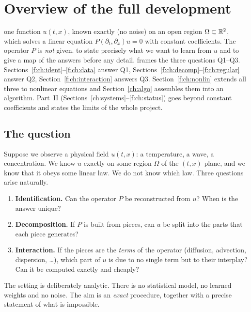 \section{Overview of the full development}\label{ch:intro}
\sectionbrief
{one function $u(t,x)$, known exactly (no noise) on an open region $\Omega\subset\mathbb{R}^2$, which solves a linear equation $P(\partial_t,\partial_x)u=0$ with constant coefficients. The operator $P$ is \emph{not} given.}
{to state precisely what we want to learn from $u$ and to give a map of the answers before any detail.}
{frames the three questions Q1--Q3. Sections~\ref{f:ch:ident}--\ref{f:ch:data} answer Q1, Sections~\ref{f:ch:decomp}--\ref{f:ch:regular} answer Q2, Section~\ref{f:ch:interaction} answers Q3. Section~\ref{f:ch:nonlin} extends all three to nonlinear equations and Section~\ref{ch:algo} assembles them into an algorithm. Part~II (Sections~\ref{ch:systems}--\ref{f:ch:status}) goes beyond constant coefficients and states the limits of the whole project.}

\subsection{The question}

Suppose we observe a physical field $u(t,x)$: a temperature, a wave, a concentration. We know $u$ exactly on some region $\Omega$ of the $(t,x)$ plane, and we know that it obeys some linear law. We do not know which law. Three questions arise naturally.

\begin{enumerate}[label=\textbf{Q\arabic*.},leftmargin=1.2cm]
\item \textbf{Identification.} Can the operator $P$ be reconstructed from $u$? When is the answer unique?
\item \textbf{Decomposition.} If $P$ is built from pieces, can $u$ be split into the parts that each piece generates?
\item \textbf{Interaction.} If the pieces are the \emph{terms} of the operator (diffusion, advection, dispersion, \dots), which part of $u$ is due to no single term but to their interplay? Can it be computed exactly and cheaply?
\end{enumerate}

The setting is deliberately analytic. There is no statistical model, no learned weights and no noise. The aim is an \emph{exact} procedure, together with a precise statement of what is impossible.

